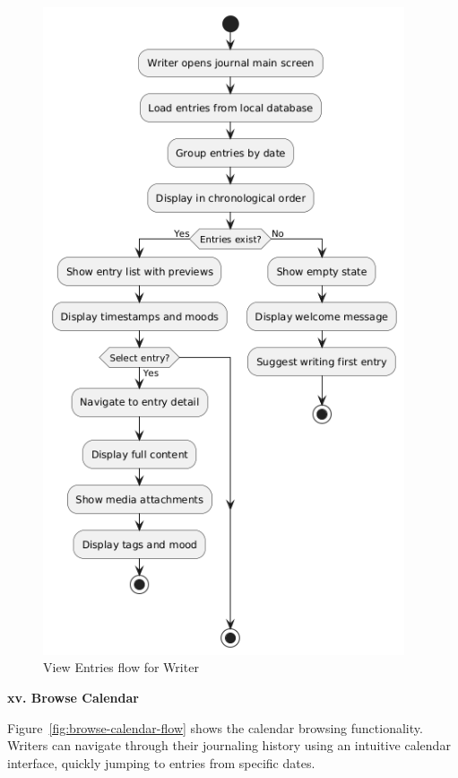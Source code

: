 \begin{figure}[H]
\centering
\includegraphics[width=0.95\textwidth,height=0.7\textheight,keepaspectratio]{files/imgs/view_entries_flow.png}
\caption{View Entries flow for Writer}
\label{fig:view-entries-flow}
\end{figure}
\clearpage

\textbf{xv. Browse Calendar}


Figure~\ref{fig:browse-calendar-flow} shows the calendar browsing functionality. Writers can navigate through their journaling history using an intuitive calendar interface, quickly jumping to entries from specific dates.

